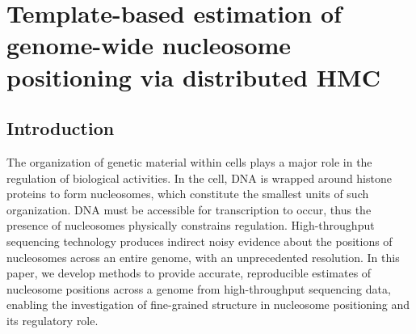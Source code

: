 

\chapter{Template-based estimation of genome-wide nucleosome positioning via distributed HMC}
\label{ch:nucleosomes}


\section{Introduction}
\label{nucleosomes:sec:intro}

The organization of genetic material within cells plays a major role in the regulation of biological activities.
In the cell, DNA is wrapped around histone proteins to form nucleosomes, which constitute the smallest units of such organization. 
DNA must be accessible for transcription to occur, thus the presence of nucleosomes physically constrains regulation. 
High-throughput sequencing technology produces indirect noisy evidence about the positions of nucleosomes across an entire genome, with an unprecedented resolution.
In this paper, we develop methods to provide accurate, reproducible estimates of nucleosome positions across a genome from high-throughput sequencing data, enabling the investigation of  fine-grained structure in nucleosome positioning and its regulatory role.

